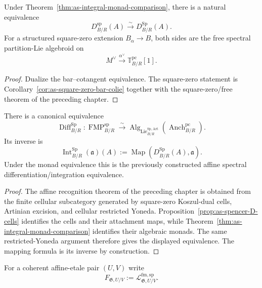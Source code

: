 \begin{proposition}
\label{prop:as-spencer-D-cells}
Under
Theorem~\ref{thm:as-integral-monad-comparison}, there is a natural equivalence
\[
\boxed{
    D_{B/R}^{\mathrm{sp}}(A)
    \xrightarrow{\sim}
    D_{B/R}^{\mathrm{Sp}}(A).
}
\]
For a structured square-zero extension $B_\alpha\to B$, both sides are the
free spectral partition-Lie algebroid on
\[
    M^\vee
    \xrightarrow{\alpha^\vee}
    \mathbb T_{B/R}^{\mathrm{pc}}[1].
\]
\end{proposition}

\begin{proof}
Dualize the bar--cotangent equivalence.  The square-zero statement is
Corollary~\ref{cor:as-square-zero-bar-colie} together with the
square-zero/free theorem of the preceding chapter.
\end{proof}

\begin{theorem}
\label{thm:as-affine-spencer-recognition}
There is a canonical equivalence
\[
\boxed{
    \operatorname{Diff}_{B/R}^{\mathrm{Sp}}:
    \operatorname{FMP}^{\mathrm{sp}}_{B/R}
    \xrightarrow{\sim}
    \operatorname{Alg}_{\operatorname{Lie}^{\mathrm{Sp,Art}}_{B/R}}
    \left(
        \operatorname{Anch}^{\mathrm{pc}}_{B/R}
    \right).
}
\]
Its inverse is
\[
\boxed{
    \operatorname{Int}_{B/R}^{\mathrm{Sp}}(\mathfrak a)(A)
    :=
    \operatorname{Map}
    \left(
        D_{B/R}^{\mathrm{Sp}}(A),
        \mathfrak a
    \right).
}
\]
Under the monad equivalence this is the previously constructed affine
spectral differentiation/integration equivalence.
\end{theorem}

\begin{proof}
The affine recognition theorem of the preceding chapter is obtained from the
finite cellular subcategory generated by square-zero Koszul-dual cells,
Artinian excision, and cellular restricted Yoneda.
Proposition~\ref{prop:as-spencer-D-cells} identifies the cells and their
attachment maps, while
Theorem~\ref{thm:as-integral-monad-comparison} identifies their algebraic
monads.  The same restricted-Yoneda argument therefore gives the displayed
equivalence.  The mapping formula is its inverse by construction.
\end{proof}

For a coherent affine-etale pair $(U,V)$ write
\[
    F_{\mathfrak G,U/V}
    :=
    \mathcal L_{\mathfrak G,U/V}^{\mathrm{fm,sp}}.
\]

